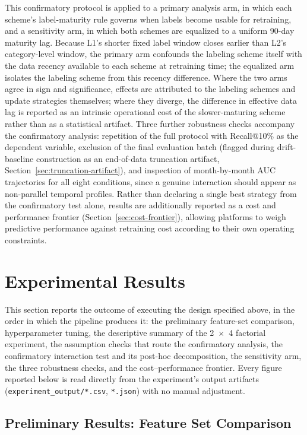 This confirmatory protocol is applied to a primary analysis arm, in which each scheme's label-maturity rule governs when labels become usable for retraining, and a sensitivity arm, in which both schemes are equalized to a uniform 90-day maturity lag. Because L1's shorter fixed label window closes earlier than L2's category-level window, the primary arm confounds the labeling scheme itself with the data recency available to each scheme at retraining time; the equalized arm isolates the labeling scheme from this recency difference. Where the two arms agree in sign and significance, effects are attributed to the labeling schemes and update strategies themselves; where they diverge, the difference in effective data lag is reported as an intrinsic operational cost of the slower-maturing scheme rather than as a statistical artifact. Three further robustness checks accompany the confirmatory analysis: repetition of the full protocol with Recall@10\% as the dependent variable, exclusion of the final evaluation batch (flagged during drift-baseline construction as an end-of-data truncation artifact, Section~\ref{sec:truncation-artifact}), and inspection of month-by-month AUC trajectories for all eight conditions, since a genuine interaction should appear as non-parallel temporal profiles. Rather than declaring a single best strategy from the confirmatory test alone, results are additionally reported as a cost and performance frontier (Section~\ref{sec:cost-frontier}), allowing platforms to weigh predictive performance against retraining cost according to their own operating constraints.

\section{Experimental Results}

This section reports the outcome of executing the design specified above, in the order in which the pipeline produces it: the preliminary feature-set comparison, hyperparameter tuning, the descriptive summary of the 2~$\times$~4 factorial experiment, the assumption checks that route the confirmatory analysis, the confirmatory interaction test and its post-hoc decomposition, the sensitivity arm, the three robustness checks, and the cost--performance frontier. Every figure reported below is read directly from the experiment's output artifacts (\texttt{experiment\_output/*.csv}, \texttt{*.json}) with no manual adjustment.

\subsection{Preliminary Results: Feature Set Comparison}

